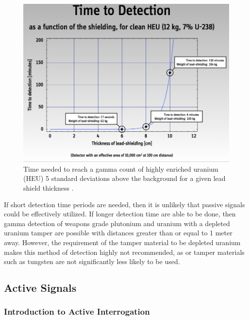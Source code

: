 \documentclass{report}
\newcommand{\myparagraph}[1]{\paragraph*{#1\\}}
\begin{document}
\begin{figure}
 \centering
 \includegraphics[trim = 0cm 0.1cm 0cm 0cm, clip,scale=0.4]{./figures/shield_time.png}
   \caption{Time needed to reach a gamma count of highly enriched uranium (HEU) 5 standard deviations above the background for a given lead shield thickness \cite{Glaser2007}.}
     \label{fig:shield_time}
\end{figure}



If short detection time periods are needed, then it is unlikely that passive signals could be effectively utilized. If longer detection time are able to be done, then gamma detection of weapons grade plutonium and uranium with a depleted uranium tamper are possible with distances greater than or equal to 1 meter away. However, the requirement of the tamper material to be depleted uranium makes this method of detection highly not recommended, as or tamper materials such as tungsten are not significantly less likely to be used. 



\subsection{Active Signals}


\subsubsection{Introduction to Active Interrogation} \label{sec:intro_active_interrogation}
\end{document}
